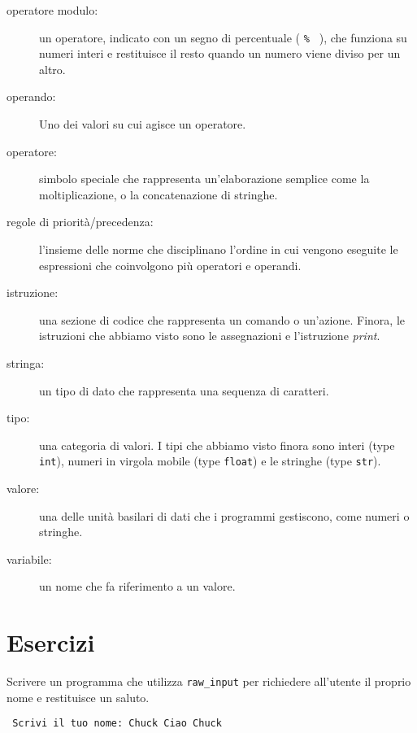 \begin{description}
\item[operatore modulo:]  un operatore, indicato con un segno di percentuale ( {\tt \% } ), che funziona su numeri interi e restituisce il resto quando un numero viene diviso per un altro.
 

\item[operando:]  Uno dei valori su cui agisce un operatore.

\item[operatore:]  simbolo speciale che rappresenta un'elaborazione semplice come la moltiplicazione, o la concatenazione di stringhe. 

\item[regole di priorit\`{a}/precedenza:]  l'insieme delle norme che disciplinano l'ordine in cui vengono eseguite le espressioni che coinvolgono pi\`{u} operatori e operandi.  

\item[istruzione:]  una sezione di codice che rappresenta un comando o un'azione. Finora, le istruzioni che abbiamo visto sono le assegnazioni e l'istruzione \emph{print}.

\item[stringa:] un tipo di dato che rappresenta una sequenza di caratteri.

\item[tipo:] una categoria di valori. I tipi che abbiamo visto finora sono interi (type {\tt int}), numeri in virgola mobile (type {\tt float}) e le stringhe (type {\tt str}).

\item[valore:]  una delle unit\`{a} basilari di dati che i programmi gestiscono, come numeri o stringhe. 

\item[variabile:]  un nome che fa riferimento a un valore. 

\end{description}

\section{Esercizi}

\begin{ex} Scrivere un programma che utilizza \verb"raw_input" per richiedere all'utente il proprio nome e restituisce un saluto.

\begin{verbatim} Scrivi il tuo nome: Chuck Ciao Chuck \end{verbatim}

\end{ex}

